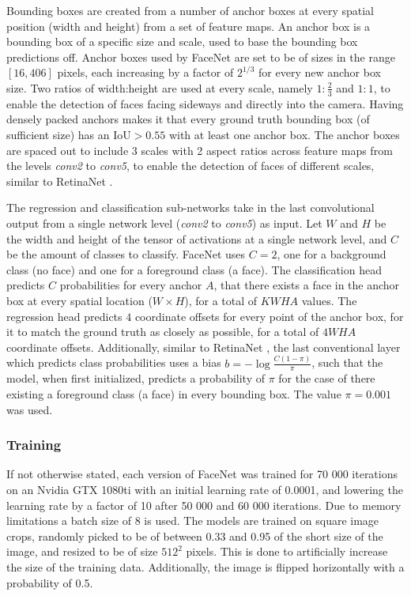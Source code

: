 \documentclass[a4paper, twoside]{article}
\begin{document}
Bounding boxes are created from a number of anchor boxes at every spatial position (width and height) from a set of feature maps. An anchor box is a bounding box of a specific size and scale, used to base the bounding box predictions off. Anchor boxes used by FaceNet are set to be of sizes in the range $[16, 406]$ pixels, each increasing by a factor of $2^{1/3}$ for every new anchor box size. Two ratios of width:height are used at every scale, namely $1:\frac{2}{3}$ and $1:1$, to enable the detection of faces facing sideways and directly into the camera. Having densely packed anchors makes it that every ground truth bounding box (of sufficient size) has an IoU$>0.55$ with at least one anchor box. The anchor boxes are spaced out to include 3 scales with 2 aspect ratios across feature maps from the levels \textit{conv2} to \textit{conv5}, to enable the detection of faces of different scales, similar to RetinaNet \cite{retinanet}.

The regression and classification sub-networks take in the last convolutional output from a single network level (\textit{conv2} to \textit{conv5}) as input. Let $W$ and $H$ be the width and height of the tensor of activations at a single network level, and $C$ be the amount of classes to classify. FaceNet uses $C=2$, one for a background class (no face) and one for a foreground class (a face). The classification head predicts $C$ probabilities for every anchor $A$, that there exists a face in the anchor box at every spatial location ($W \times H$), for a total of $KWHA$ values. The regression head predicts $4$ coordinate offsets for every point of the anchor box, for it to match the ground truth as closely as possible, for a total of $4WHA$ coordinate offsets. Additionally, similar to RetinaNet \cite{retinanet}, the last conventional layer which predicts class probabilities uses a bias $b = -\log{\frac{C(1-\pi)}{\pi}}$, such that the model, when first initialized, predicts a probability of $\pi$ for the case of there existing a foreground class (a face) in every bounding box. The value $\pi = 0.001$ was used.

\subsubsection{Training}
If not otherwise stated, each version of FaceNet was trained for 70 000 iterations on an Nvidia GTX 1080ti with an initial learning rate of 0.0001, and lowering the learning rate by a factor of 10 after 50 000 and 60 000 iterations. Due to memory limitations a batch size of 8 is used. The models are trained on square image crops, randomly picked to be of between 0.33 and 0.95 of the short size of the image, and resized to be of size $512^2$ pixels. This is done to artificially increase the size of the training data. Additionally, the image is flipped horizontally with a probability of 0.5.
\end{document}
